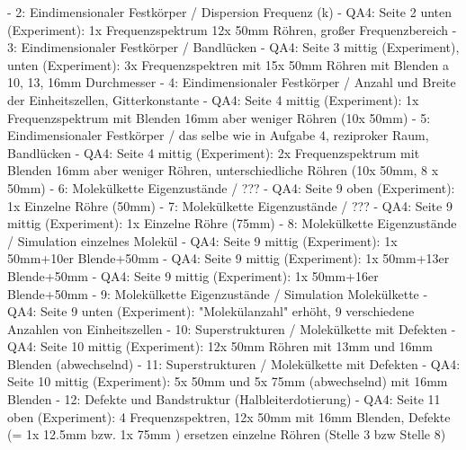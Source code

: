 - 2: Eindimensionaler Festkörper / Dispersion Frequenz (k)
    - QA4: Seite 2 unten (Experiment): 1x Frequenzspektrum 12x 50mm Röhren, großer Frequenzbereich
- 3: Eindimensionaler Festkörper / Bandlücken
    - QA4: Seite 3 mittig (Experiment), unten (Experiment): 3x Frequenzspektren mit 15x 50mm Röhren mit Blenden a 10, 13, 16mm Durchmesser
- 4: Eindimensionaler Festkörper / Anzahl und Breite der Einheitszellen, Gitterkonstante
    - QA4: Seite 4 mittig (Experiment): 1x Frequenzspektrum mit Blenden 16mm aber weniger Röhren (10x 50mm)
- 5: Eindimensionaler Festkörper / das selbe wie in Aufgabe 4, reziproker Raum, Bandlücken
    - QA4: Seite 4 mittig (Experiment): 2x Frequenzspektrum mit Blenden 16mm aber weniger Röhren, unterschiedliche Röhren (10x 50mm, 8 x 50mm)
- 6: Molekülkette Eigenzustände / ???
    - QA4: Seite 9 oben (Experiment): 1x Einzelne Röhre (50mm)
- 7: Molekülkette Eigenzustände / ???
    - QA4: Seite 9 mittig (Experiment): 1x Einzelne Röhre (75mm)
- 8: Molekülkette Eigenzustände / Simulation einzelnes Molekül
    - QA4: Seite 9 mittig (Experiment): 1x 50mm+10er Blende+50mm
    - QA4: Seite 9 mittig (Experiment): 1x 50mm+13er Blende+50mm
    - QA4: Seite 9 mittig (Experiment): 1x 50mm+16er Blende+50mm
- 9: Molekülkette Eigenzustände / Simulation Molekülkette
    - QA4: Seite 9 unten (Experiment): "Molekülanzahl" erhöht, 9 verschiedene Anzahlen von Einheitszellen
- 10: Superstrukturen / Molekülkette mit Defekten
    - QA4: Seite 10 mittig (Experiment): 12x 50mm Röhren mit 13mm und 16mm Blenden (abwechselnd)
- 11: Superstrukturen / Molekülkette mit Defekten
    - QA4: Seite 10 mittig (Experiment): 5x 50mm und 5x 75mm (abwechselnd) mit 16mm Blenden
- 12: Defekte und Bandstruktur (Halbleiterdotierung)
    - QA4: Seite 11 oben (Experiment): 4 Frequenzspektren, 12x 50mm mit 16mm Blenden, Defekte (= 1x 12.5mm bzw. 1x 75mm ) ersetzen einzelne Röhren (Stelle 3 bzw Stelle 8)
